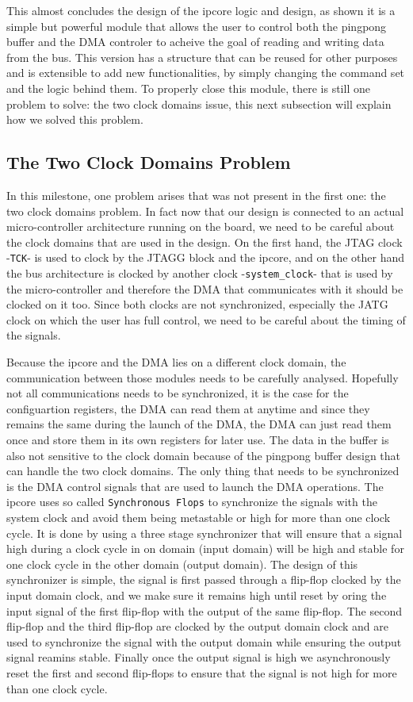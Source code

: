 \documentclass[a4paper,11pt,oneside]{report}
\begin{document}
This almost concludes the design of the ipcore logic and design, as shown it is a simple but 
powerful module that allows the user to control both the pingpong buffer and the DMA controler to acheive the goal of reading and writing data from the bus.
This version has a structure that can be reused for other purposes and is extensible to add new functionalities, by simply changing the command set and the logic 
behind them.
To properly close this module, there is still one problem to solve: the two clock domains issue, this next subsection will explain how we solved this problem.

\subsection{The Two Clock Domains Problem}

In this milestone, one problem arises that was not present in the first one: the two clock domains problem. In fact now that our design is connected to 
an actual micro-controller architecture running on the board, we need to be careful about the clock domains that are used in the design.
On the first hand, the JTAG clock -\texttt{TCK}- is used to clock by the JTAGG block and the ipcore, and on the other hand the bus architecture 
is clocked by another clock -\texttt{system_clock}- that is used by the micro-controller and therefore the DMA that communicates with it should be clocked on it too.
Since both clocks are not synchronized, especially the JATG clock on which the user has full control, we need to be careful about the timing of the signals.

Because the ipcore and the DMA lies on a different clock domain, the communication between those modules needs to be carefully analysed.
Hopefully not all communications needs to be synchronized, it is the case for the configuartion registers, the DMA can read them at anytime and since they remains the same 
during the launch of the DMA, the DMA can just read them once and store them in its own registers for later use.
The data in the buffer is also not sensitive to the clock domain because of the pingpong buffer design that can handle the two clock domains.
The only thing that needs to be synchronized is the DMA control signals that are used to launch the DMA operations.
The ipcore uses so called \texttt{Synchronous Flops} to synchronize the signals with the system clock and avoid them being metastable or high for more than one clock cycle.
It is done by using a three stage synchronizer that will ensure that a signal high during a clock cycle in on domain (input domain) will be high and stable for one clock cycle in the other domain (output domain).
The design of this synchronizer is simple, the signal is first passed through a flip-flop clocked by the input domain clock, and we make sure it remains high until reset by oring the 
input signal of the first flip-flop with the output of the same flip-flop.
The second flip-flop and the third flip-flop are clocked by the output domain clock and are used to synchronize the signal with the output domain while ensuring the output signal reamins stable.
Finally once the output signal is high we asynchronously reset the first and second flip-flops to ensure that the signal is not high for more than one clock cycle.
\end{document}
